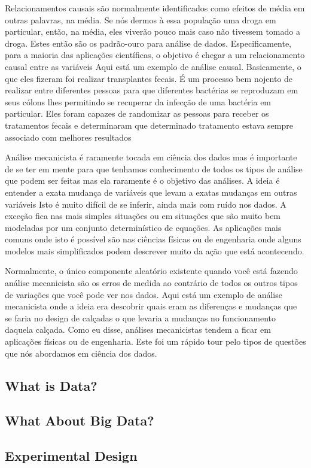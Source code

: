 Relacionamentos causais são normalmente identificados como efeitos de média em outras palavras, na média. Se nós dermos à essa população uma droga em particular, então, na média, eles viverão pouco mais caso não tivessem tomado a droga. Estes então são os padrão-ouro para análise de dados. Especificamente, para a maioria das aplicações científicas, o objetivo é chegar a um relacionamento causal entre as variáveis Aqui está um exemplo de análise causal. Basicamente, o que eles fizeram foi realizar transplantes fecais. É um processo bem nojento de realizar entre diferentes pessoas para que diferentes bactérias se reproduzam em seus cólons lhes permitindo se recuperar da infecção de uma bactéria em particular. Eles foram capazes de randomizar as pessoas para receber os tratamentos fecais e determinaram que determinado tratamento estava sempre associado com melhores resultados 

Análise mecanicista é raramente tocada em ciência dos dados mas é importante de se ter em mente para que tenhamos conhecimento de todos os tipos de análise que podem ser feitas mas ela raramente é o objetivo das análises. A ideia é entender a exata mudança de variáveis que levam a exatas mudanças em outras variáveis Isto é muito difícil de se inferir, ainda mais com ruído nos dados. A exceção fica nas mais simples situações ou em situações que são muito bem modeladas por um conjunto determinístico de equações. As aplicações mais comuns onde isto é possível são nas ciências físicas ou de engenharia onde alguns modelos mais simplificados podem descrever muito da ação que está acontecendo. 

Normalmente, o único componente aleatório existente quando você está fazendo análise mecanicista são os erros de medida ao contrário de todos os outros tipos de variações que você pode ver nos dados. Aqui está um exemplo de análise mecanicista onde a ideia era descobrir quais eram as diferenças e mudanças que se faria no design de calçadas o que levaria a mudanças no funcionamento daquela calçada. Como eu disse, análises mecanicistas tendem a ficar em aplicações físicas ou de engenharia. Este foi um rápido tour pelo tipos de questões que nós abordamos em ciência dos dados.


\subsection{What is Data?}


\subsection{What About Big Data?}


\subsection{Experimental Design}

